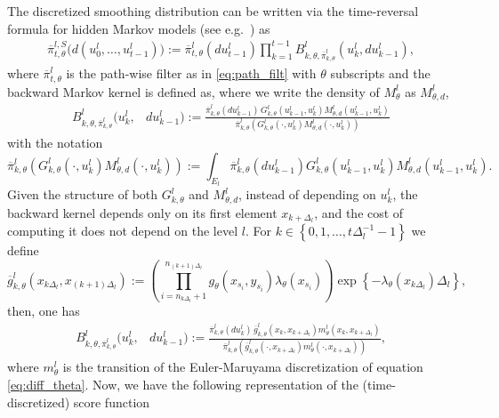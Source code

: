 \documentclass[english]{article}
\begin{document}
The discretized smoothing distribution can be written via the time-reversal formula for hidden Markov models (see e.g.~\cite[Section 3.2]{beskos}) as
\begin{align*}
\overline{\pi}_{t,\theta}^{l,S}\big(d(u_{0}^l,\dots,u_{t-1}^l) \big) := \overline{\pi}_{t,\theta}^l(du_{t-1}^l)
\prod_{k=1}^{t-1}  B_{k,\theta,\overline{\pi}_{k,\theta}^l}^l(u_{k}^l,du_{k-1}^l),
\end{align*}
where $\overline\pi_{t,\theta}^l$ is the path-wise filter as in \eqref{eq:path_filt} with $\theta$ subscripts
and the backward Markov kernel is defined as, where we write the density of $M_{\theta}^l$ as $M_{\theta,d}^l$,
\begin{align}
\label{eq:BACK}
B_{k,\theta,\overline{\pi}_{k,\theta}^l}^l(u_{k}^l, &du_{k-1}^l) :=  
\frac{\overline{\pi}_{k,\theta}^l(du_{k-1}^l)\, 
G_{k,\theta}^l(u_{k-1}^l,u_{k}^l) M_{\theta,d}^l(u_{k-1}^l,u_{k}^l)} {\overline{\pi}_{k,\theta}^l(
G_{k,\theta}^l(\cdot,u_{k}^l) M_{\theta,d}^l(\cdot,u_{k}^l))}
\end{align}
with the notation $$\overline{\pi}_{k,\theta}^l(
G_{k,\theta}^l(\cdot,u_{k}^l) M_{\theta,d}^l(\cdot,u_{k}^l)) := \int_{E_l}\overline{\pi}_{k,\theta}^l(du_{k-1}^l) 
G_{k,\theta}^l(u_{k-1}^l,u_{k}^l) M_{\theta,d}^l(u_{k-1}^l,u_{k}^l).
$$
Given the structure of both $G_{k,\theta}^l$ and $M_{\theta,d}^l$, instead of depending on $u_{k}^l$, the backward kernel depends only on its first element $x_{k+\Delta_l}$, and the cost of computing it does not depend on the level $l$. For $k \in\left\{0,1, \ldots, t\Delta_l^{-1}-1\right\}$ we define
$$
\overline{g}_{k, \theta}^l\left(x_{k \Delta_l},x_{(k+1) \Delta_l}\right):=  \left(\prod_{i=n_{k\Delta_l}+1}^{n_{(k+1)\Delta_l}} g_{\theta}({x}_{s_i},y_{s_i})\lambda_{\theta}({x}_{s_i})\right)
\exp\left\{- \lambda_{\theta}(x_{k\Delta_l})\Delta_l\right\},
$$
then, one has
\begin{align}
B_{k,\theta,\overline{\pi}_{k,\theta}^l}^l(u_{k}^l, &du_{k-1}^l) :=  
\frac{\overline{\pi}_{k,\theta}^l(du_{k}^l)\, 
\overline{g}_{k,\theta}^l(x_{k},x_{k+\Delta_l}) m_{\theta}^l(x_{k},x_{k+\Delta_l})} {\overline{\pi}_{k,\theta}^l(
\overline{g}_{k,\theta}^l(\cdot,x_{k+\Delta_l}) m_{\theta}^l(\cdot,x_{k+\Delta_l}))},
\end{align}  
where $m_\theta^l$ is the transition of the Euler-Maruyama discretization of equation \eqref{eq:diff_theta}. Now, we have the following representation of the (time-discretized) score function
\end{document}

